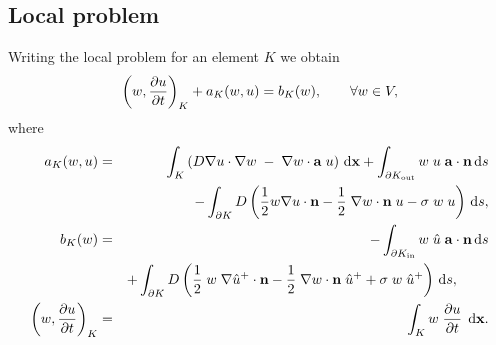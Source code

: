 \documentclass[mathserif]{beamer}
\begin{document}
\subsection{Local problem}
\begin{frame}
Writing the local problem for an element $K$ we obtain
\begin{equation}
\left(w,\frac{\partial u}{\partial t}\right)_K+a_K(w,u)=b_K(w),\qquad \forall w\in V,
\label{weakloc}
\end{equation}
where
\begin{eqnarray}
a_K(w,u)&=&\int_{K}\left( D \nabla u \cdot \nabla w 
\;-\; \nabla w\cdot\mathbf{a} \; u \right)\,\mathrm{d}\mathbf{x}
+\int_{\partial K_{\rm out}} w \; u \; \mathbf{a}\cdot\mathbf{n}\,\mathrm{d}s \nonumber\\
&&-\int_{\partial K} D \left( \frac 12 w \nabla u \cdot \mathbf{n}
- \frac 12 \; \nabla w \cdot \mathbf{n} \; u - \sigma \; w \; u \right)\,\mathrm{d}s, \label{loc1}\\
b_K(w)&=&-\int_{\partial K_{\rm in}} w\; \hat u\; \mathbf{a}\cdot\mathbf{n}\,\mathrm{d}s \nonumber\\
&&+\int_{\partial K} D \left(\frac 12 \; w \; \nabla \hat u^+ \cdot \mathbf{n}
- \frac 12 \; \nabla w \cdot \mathbf{n} \; \hat u^+ 
+ \sigma \; w \; \hat u^+ \right)\,\mathrm{d}s, \hspace{8mm}\label{loc2}\\
\left(w,\frac{\partial u}{\partial t}\right)_K&=&
\int_{K}w\; \frac{\partial u}{\partial t}\; \,\mathrm{d}\mathbf{x}.\label{loc3}
\end{eqnarray}

\end{frame}
\end{document}
